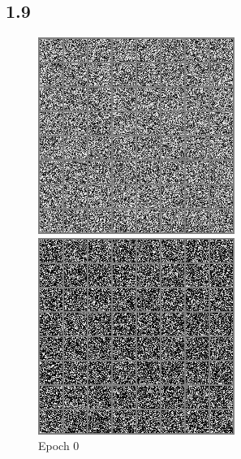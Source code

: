 \documentclass{article}
\begin{document}
\subsection*{1.9}

\begin{figure}[H]
    \centering
    \begin{minipage}{0.3\textwidth}
        \centering
        \includegraphics[width=\textwidth]{images/epoch_0_samples.png}
        \caption{Epoch 0}
        \label{fig:epoch_0}
    \end{minipage}
    \hfill
    \begin{minipage}{0.3\textwidth}
        \centering
        \includegraphics[width=\textwidth]{images/epoch_10_samples.png}

\end{minipage}
\end{figure}
\end{document}
